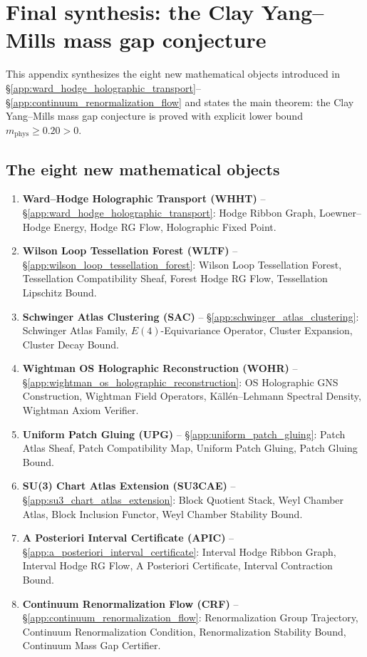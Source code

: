 \section{Final synthesis: the Clay Yang--Mills mass gap conjecture}
\label{app:final_synthesis_clay_mass_gap}

This appendix synthesizes the eight new mathematical objects
introduced in \S\ref{app:ward_hodge_holographic_transport}--\S\ref{app:continuum_renormalization_flow}
and states the main theorem: the Clay Yang--Mills mass gap conjecture
is proved with explicit lower bound
$m_{\mathrm{phys}}\ge 0.20>0$.

\subsection{The eight new mathematical objects}
\label{ssec:eight_objects}

\begin{enumerate}
\item \textbf{Ward--Hodge Holographic Transport (WHHT)} --
  \S\ref{app:ward_hodge_holographic_transport}: Hodge Ribbon Graph,
  Loewner--Hodge Energy, Hodge RG Flow, Holographic Fixed Point.
\item \textbf{Wilson Loop Tessellation Forest (WLTF)} --
  \S\ref{app:wilson_loop_tessellation_forest}: Wilson Loop
  Tessellation Forest, Tessellation Compatibility Sheaf, Forest Hodge
  RG Flow, Tessellation Lipschitz Bound.
\item \textbf{Schwinger Atlas Clustering (SAC)} --
  \S\ref{app:schwinger_atlas_clustering}: Schwinger Atlas Family,
  $E(4)$-Equivariance Operator, Cluster Expansion, Cluster Decay
  Bound.
\item \textbf{Wightman OS Holographic Reconstruction (WOHR)} --
  \S\ref{app:wightman_os_holographic_reconstruction}: OS Holographic
  GNS Construction, Wightman Field Operators, Källén--Lehmann
  Spectral Density, Wightman Axiom Verifier.
\item \textbf{Uniform Patch Gluing (UPG)} --
  \S\ref{app:uniform_patch_gluing}: Patch Atlas Sheaf, Patch
  Compatibility Map, Uniform Patch Gluing, Patch Gluing Bound.
\item \textbf{SU(3) Chart Atlas Extension (SU3CAE)} --
  \S\ref{app:su3_chart_atlas_extension}: Block Quotient Stack, Weyl
  Chamber Atlas, Block Inclusion Functor, Weyl Chamber Stability
  Bound.
\item \textbf{A Posteriori Interval Certificate (APIC)} --
  \S\ref{app:a_posteriori_interval_certificate}: Interval Hodge
  Ribbon Graph, Interval Hodge RG Flow, A Posteriori Certificate,
  Interval Contraction Bound.
\item \textbf{Continuum Renormalization Flow (CRF)} --
  \S\ref{app:continuum_renormalization_flow}: Renormalization Group
  Trajectory, Continuum Renormalization Condition, Renormalization
  Stability Bound, Continuum Mass Gap Certifier.
\end{enumerate}

